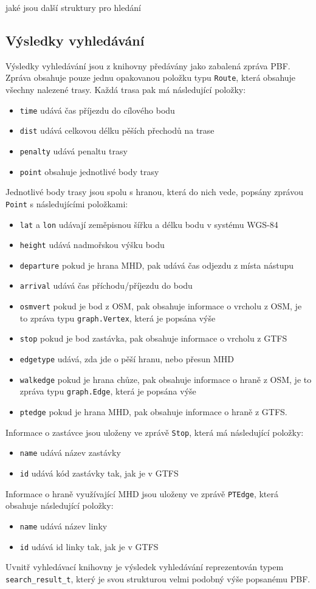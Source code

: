 \TODO jaké jsou další struktury pro hledání

\subsection{Výsledky vyhledávání}
\label{ch:formaty-dat:vysledky}
Výsledky vyhledávání jsou z knihovny předávány jako zabalená zpráva PBF. Zpráva
obsahuje pouze jednu opakovanou položku typu {\tt Route}, která obsahuje všechny
nalezené trasy. Každá trasa pak má následující položky: 
\begin{itemize}
	\item {\tt time} udává čas příjezdu do cílového bodu
	\item {\tt dist} udává celkovou délku pěších přechodů na trase
	\item {\tt penalty} udává penaltu trasy
	\item {\tt point} obsahuje jednotlivé body trasy
\end{itemize}
Jednotlivé body trasy jsou spolu s hranou, která do nich vede, popsány zprávou
{\tt Point} s následujícími položkami: 
\begin{itemize}
	\item {\tt lat} a {\tt lon} udávají zeměpisnou šířku a délku bodu v
	systému WGS-84
	\item {\tt height} udává nadmořskou výšku bodu
	\item {\tt departure} pokud je hrana MHD, pak udává čas odjezdu z místa
	nástupu
	\item {\tt arrival} udává čas příchodu/příjezdu do bodu 
	\item {\tt osmvert} pokud je bod z OSM, pak obsahuje informace o vrcholu
	z OSM, je to zpráva typu {\tt graph.Vertex}, která je popsána výše
	\item {\tt stop} pokud je bod zastávka, pak obsahuje informace o vrcholu z GTFS
	\item {\tt edgetype} udává, zda jde o pěší hranu, nebo přesun MHD
	\item {\tt walkedge} pokud je hrana chůze, pak obsahuje informace o
	hraně z OSM, je to zpráva typu {\tt graph.Edge}, která je popsána výše
	\item {\tt ptedge} pokud je hrana MHD, pak obsahuje informace o hraně z
	GTFS.
\end{itemize}
Informace o zastávce jsou uloženy ve zprávě {\tt Stop}, která má následující
položky:
\begin{itemize}
	\item {\tt name} udává název zastávky
	\item {\tt id} udává kód zastávky tak, jak je v GTFS
\end{itemize}
Informace o hraně využívající MHD jsou uloženy ve zprávě {\tt PTEdge}, která
obsahuje následující položky:
\begin{itemize}
	\item {\tt name} udává název linky
	\item {\tt id} udává id linky tak, jak je v GTFS
\end{itemize}
Uvnitř vyhledávací knihovny je výsledek vyhledávání reprezentován typem {\tt
search\_result\_t}, který je svou strukturou velmi podobný výše popsanému PBF.

